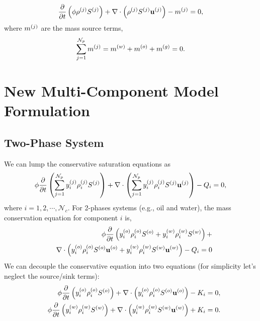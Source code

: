    \begin{equation}
       \displaystyle\frac{\partial}{\partial t}\left(\phi\mfr[\rho]{}{j}\mfr[S]{}{j}\right) + \nabla\cdot\left(\mfr[\rho]{}{j}\mfr[S]{}{j}\mfr[\mathbf{u}]{}{j}\right) -\mfr[m]{}{j} = 0, 
              \label{saturation_compositional_1}
   \end{equation}
where $\mfr[m]{}{j}$ are the mass source terms,
   \begin{displaymath}
      \summation_{j=1}^{{\cal N}_p} \mfr[m]{}{j}=\mfr[m]{}{w}+\mfr[m]{}{o}+\mfr[m]{}{g}=0. 
   \end{displaymath}

\section{New Multi-Component Model Formulation}\label{Chapter:TransportModel:Section:MultiComponentFormulation}

\subsection{Two-Phase System}\label{Chapter:TransportModel:Section:MultiComponentFormulation:Section:2PhaseSystem}

We can lump the conservative saturation equations as
    \begin{equation}
              \phi \displaystyle\frac{\partial}{\partial t}\left(\summation_{j=1}^{{\cal N}_p}\mfr[y]{i}{j}\mfr[\rho]{i}{j}\mfr[S]{}{j}\right) + \nabla\cdot\left(\summation_{j=1}^{{\cal N}_p}\mfr[y]{i}{j}\mfr[\rho]{i}{j}\mfr[S]{}{j}\mfr[\mathbf{u}]{}{j}\right) - Q_{i} = 0, \label{saturation_compositional_4}
    \end{equation} 
where $i = 1, 2, \cdots, \mathcal{N}_{c}$. For 2-phases systems (e.g., oil and water), the mass conservation equation for component $i$ is,  
     \begin{eqnarray}
             &&\phi \displaystyle\frac{\partial}{\partial t}\left(\mfr[y]{i}{o}\mfr[\rho]{i}{o}\mfr[S]{}{o} +  \mfr[y]{i}{w}\mfr[\rho]{i}{w}\mfr[S]{}{w}\right) + \nonumber \\
             && \nabla\cdot\left(\mfr[y]{i}{o} \mfr[\rho]{i}{o}\mfr[S]{}{o}\mfr[\mathbf{u}]{}{o} + \mfr[y]{i}{w}\mfr[\rho]{i}{w}\mfr[S]{}{w}\mfr[\mathbf{u}]{}{w} \right) - Q_{i} = 0 \nonumber
    \end{eqnarray}
We can decouple the conservative equation into two equations (for simplicity let's neglect the source/sink terms): 
          \begin{eqnarray}
             && \phi \displaystyle\frac{\partial}{\partial t}\left(\mfr[y]{i}{o}\mfr[\rho]{i}{o}\mfr[S]{}{o} \right) + \nabla\cdot\left(\mfr[y]{i}{o}\mfr[\rho]{i}{o}\mfr[S]{}{o}\mfr[\mathbf{u}]{}{o}  \right) - K_i  = 0, \nonumber \\
             && \phi \displaystyle\frac{\partial}{\partial t}\left(\mfr[y]{i}{w}\mfr[\rho]{i}{w}\mfr[S]{}{w}  \right) + \nabla\cdot\left(\mfr[y]{i}{w}\mfr[\rho]{i}{w}\mfr[S]{}{w}\mfr[\mathbf{u}]{}{w} \right) + K_i = 0.  \nonumber
          \end{eqnarray}

